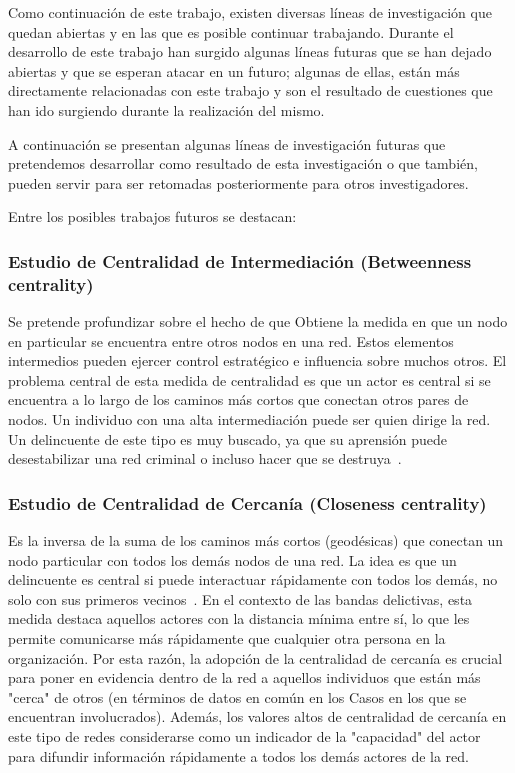 
Como continuación de este trabajo, existen diversas líneas de investigación que quedan abiertas y en las que es posible continuar trabajando. Durante el desarrollo de este trabajo han surgido algunas líneas futuras que se han dejado abiertas y que se esperan atacar en un futuro; algunas de ellas, están más directamente relacionadas con este trabajo y son el resultado de cuestiones que han ido surgiendo durante la realización del mismo.

A continuación se presentan algunas líneas de investigación futuras que pretendemos desarrollar como resultado de esta investigación o que también, pueden servir para ser retomadas posteriormente para otros investigadores. 

Entre los posibles trabajos futuros se destacan:

\subsubsection{Estudio de Centralidad de Intermediación (Betweenness centrality)}
Se pretende profundizar sobre el hecho de que 
Obtiene la medida en que un nodo en particular se encuentra entre otros nodos en una red. Estos elementos intermedios pueden ejercer control estratégico e influencia sobre muchos otros. El problema central de esta medida de centralidad es que un actor es central si se encuentra a lo largo de los caminos más cortos que conectan otros pares de nodos. Un individuo con una alta intermediación puede ser quien dirige la red. Un delincuente de este tipo es muy buscado, ya que su aprensión puede desestabilizar una red criminal o incluso hacer que se destruya~\cite{ref_article32}.

\subsubsection{Estudio de Centralidad de Cercanía (Closeness centrality)} Es la inversa de la suma de los caminos más cortos (geodésicas) que conectan un nodo particular con todos los demás nodos de una red. La idea es que un delincuente es central si puede interactuar rápidamente con todos los demás, no solo con sus primeros vecinos~\cite{ref_article33}. En el contexto de las bandas delictivas, esta medida destaca aquellos actores con la distancia mínima entre sí, lo que les permite comunicarse más rápidamente que cualquier otra persona en la organización. Por esta razón, la adopción de la centralidad de cercanía es crucial para poner en evidencia dentro de la red a aquellos individuos que están más "cerca" de otros (en términos de datos en común en los Casos en los que se encuentran involucrados). Además, los valores altos de centralidad de cercanía en este tipo de redes considerarse como un indicador de la "capacidad" del actor para difundir información rápidamente a todos los demás actores de la red.

